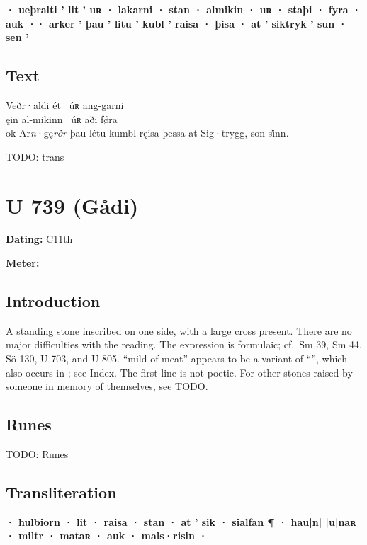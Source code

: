 \textbf{· ueþralti ’ lit ’ uʀ · lakarni · stan · almikin · uʀ · staþi · fyra · auk ·· arker ’ þau ’ litu ’ kubl ’ raisa · þisa · at ’ siktryk ’ sun · sen ’}

\subsection{Text}

\bpg\bpa[0]%
Veðr·aldi ét \hld\ úʀ ang-garni \\
ęin al-mikinn \hld\ úʀ aði fǿra \\
ok Ar\emph{n}·gę\emph{rðr} þau létu kumbl ręisa þessa at Sig·trygg, son si̇nn.\epa

\bpb TODO: trans\epb\epg

\sectionline\clearpage


\section{U 739 (Gådi)}

\begin{flushright}%
\textbf{Dating:} C11th

\textbf{Meter:} \Fornyrdislag
\end{flushright}%

\subsection{Introduction}

A standing stone inscribed on one side, with a large cross present.  There are no major difficulties with the reading.  The expression is formulaic; cf.~Sm 39, Sm 44, Sö 130, U 703, and U 805.  “mild of meat” appears to be a variant of “”, which also occurs in ; see Index.  The first line is not poetic.  For other stones raised by someone in memory of themselves, see TODO.

\subsection{Runes}

TODO: Runes%

\subsection{Transliteration}

\textbf{· hulbiorn · lit · raisa · stan · at ’ sik · sialfan ¶
· hau|n| |u|naʀ · miltr · mataʀ · auk · mals·risin ·}

